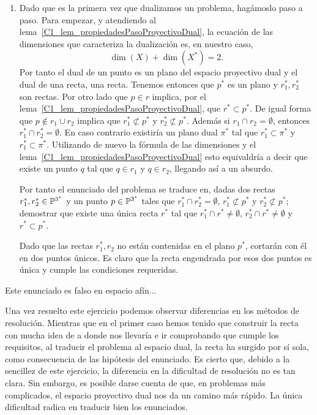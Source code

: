 \begin{exa}
\begin{enumerate}
		\item Dado que es la primera vez que dualizamos un problema, hagámoslo paso a paso. Para empezar, y atendiendo al lema~\ref{C1_lem_propiedadesPasoProyectivoDual}, la ecuación de las dimensiones que caracteriza la dualización es, en nuestro caso,
		\begin{equation*}
		\dim(X)+\dim(X^*)=2. 
		\end{equation*}
		Por tanto el dual de un punto es un plano del espacio proyectivo dual y el dual de una recta, una recta. Tenemos entonces que $p^*$ es un plano y $r_1^*,r_2^*$ son rectas. Por otro lado que $p\in r$ implica, por el lema~\ref{C1_lem_propiedadesPasoProyectivoDual}, que $r^*\subset p^*$. De igual forma que $p\not\in r_1\cup r_2$ implica que $r_1^*\not\subset p^*$ y $r_2^*\not\subset p^*$. Además si $r_1\cap r_2=\emptyset$, entonces $r_1^*\cap r_2^*=\emptyset$. En caso contrario existiría un plano dual $\pi^*$ tal que $r_1^*\subset\pi^*$ y $r_1^*\subset\pi^*$. Utilizando de nuevo la fórmula de las dimensiones y el lema~\ref{C1_lem_propiedadesPasoProyectivoDual} esto equivaldría a decir que existe un punto $q$ tal que $q\in r_1$ y $q\in r_2$, llegando así a un absurdo.
		
		Por tanto el enunciado del problema se traduce en, dadas dos rectas $r_1^*, r_2^*\in\mathbb{P}^{3^*}$ y un punto $p\in\mathbb{P}^{3^*}$ tales que $r_1^*\cap r_2^*=\emptyset$, $r_1^*\not\subset p^*$ y $r_2^*\not\subset p^*$; demostrar que existe una única recta $r^*$ tal que $r_1^*\cap r^*\not=\emptyset$, $r_2^*\cap r^*\not=\emptyset$ y $r^*\subset p^*$.
		
		Dado que las rectas $r_1^*, r_2$ no están contenidas en el plano $p^*$, cortarán con él en dos puntos únicos. Es claro que la recta engendrada por esos dos puntos es única y cumple las condiciones requeridas.
	\end{enumerate}
\end{exa}
\begin{obs}
	Este enunciado es falso en espacio afín...
\end{obs}
\begin{obs}
	Una vez resuelto este ejercicio podemos observar diferencias en los métodos de resolución. Mientras que en el primer caso hemos tenido que construir la recta con mucha idea de a donde nos llevaría e ir comprobando que cumple los requisitos, al traducir el problema al espacio dual, la recta ha surgido por sí sola, como consecuencia de las hipótesis del enunciado. Es cierto que, debido a la sencillez de este ejercicio, la diferencia en la dificultad de resolución no es tan clara. Sin embargo, es posible darse cuenta de que, en problemas más complicados, el espacio proyectivo dual nos da un camino más rápido. La única dificultad radica en traducir bien los enunciados.
\end{obs}